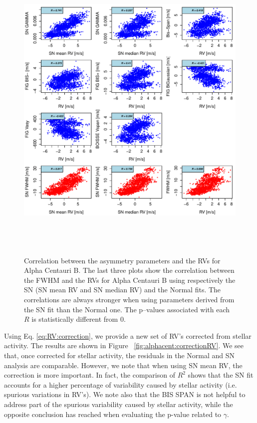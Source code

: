 \documentclass[11pt, oneside]{article}
\begin{document}
\begin{figure}[htbp]
   \centering
\includegraphics[height = 6in]{HD12862_[4]Comparison_para.pdf}  
   \caption{Correlation between the asymmetry parameters and the RVs for Alpha Centauri B. The last three plots show the correlation between the FWHM and the RVs for Alpha Centauri B using respectively the SN (SN mean RV and SN median RV) and the Normal fits. The correlations are always stronger when using parameters derived from the SN fit than the Normal one. The p--values associated with each $R$ is statistically different from $0$.}
   \label{fig:alphacent:corrPlot}
\end{figure}
%

Using Eq. \ref{eq:RV:correction}, we provide a new set of RV's corrected from stellar activity. The results are shown in Figure ~\ref{fig:alphacent:correctionRV}. We see that, once corrected for stellar activity, the residuals in the Normal and SN analysis are comparable. However, we note that when using SN mean RV, the correction is more important. In fact, the comparison of $R^2$ shows that the SN fit accounts for a higher percentage of variability caused by stellar activity (i.e. spurious variations in RV's). We note also that the BIS SPAN is not helpful to address part of the spurious variability caused by stellar activity, while the opposite conclusion has reached when evaluating the p-value related to $\gamma$.
\end{document}
